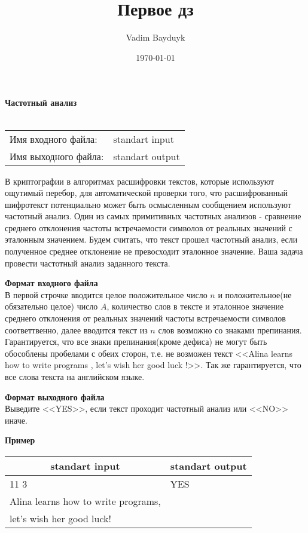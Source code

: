 \documentclass[10pt, a4paper]{article}
\title{Первое дз}
\author{Vadim Bayduyk}
\date{\today}
\begin{document}
	{\selectfont
		\noindent\LARGE\textbf{Частотный анализ}\\\\
		\normalsize
		\begin{tabular}{ll}
			\indent Имя входного файла: & standart input\\
			\indent Имя выходного файла: & standart output\\
		\end{tabular}
		
		\noindent В криптографии в алгоритмах расшифровки текстов, которые используют ощутимый перебор, для автоматической проверки того, что расшифрованный шифротекст потенциально может быть осмысленным сообщением используют частотный анализ. Один из самых примитивных частотных анализов  - сравнение среднего отклонения частоты встречаемости символов от реальных значений с эталонным значением. Будем считать, что текст прошел частотный анализ, если полученное среднее отклонение не превосходит эталонное значение. Ваша задача  провести частотный анализ заданного текста.
		
		\noindent\large\textbf{Формат входного файла}\\
		\normalsize В первой строчке вводится целое положительное число $n$ и положительное(не обязательно целое) число $A$, количество слов в тексте и эталонное значение среднего отклонения от реальных значений частоты встречаемости символов соответтвенно, далее вводится текст из $n$ слов возможно со знаками препинания. Гарантируется, что все знаки препинания(кроме дефиса) не могут быть обособлены пробелами с обеих сторон, т.е. не возможен текст <<Alina learns how to write programs  , let's wish her good luck !>>. Так же гарантируется, что все слова текста на английском языке. 
		
		\noindent\large\textbf{Формат выходного файла}\\\normalsize Выведите <<YES>>, если текст проходит частотный анализ или <<NO>> иначе.
		
		\noindent\large\textbf{Пример}\normalsize
		
		\noindent\begin{tabular}{|p{5,5cm}|p{}|}
			\hline
			\multicolumn{1}{|c|}{standart input} & \multicolumn{1}{c|}{standart output}\\\hline
			11 3 & YES \\
			Alina learns how to write programs, & \\
			let's wish her good luck! &\\\hline
		\end{tabular}
		
}
\end{document}
